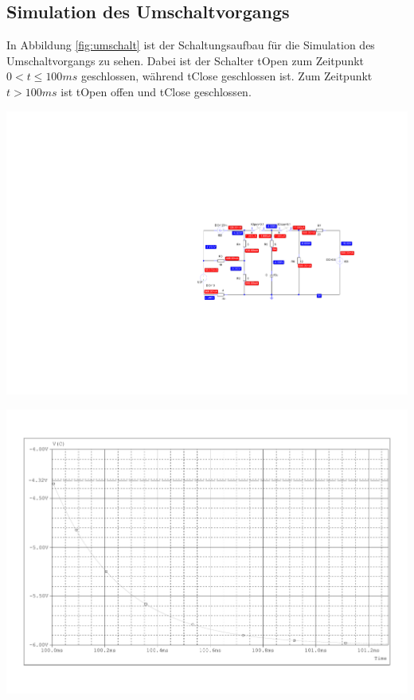 \documentclass[11pt]{scrartcl}
\begin{document}
\newpage
\subsection{Simulation des Umschaltvorgangs}
In Abbildung \ref{fig:umschalt} ist der Schaltungsaufbau für die Simulation des Umschaltvorgangs zu sehen.
Dabei ist der Schalter tOpen zum Zeitpunkt $0 < t \leq 100 \unit{ms}$ geschlossen, während tClose geschlossen ist.
Zum Zeitpunkt $t > 100 \unit{ms}$ ist tOpen offen und tClose geschlossen.

\begin{center}
  \includegraphics[scale=1.3]{./Assets/gesamter Schaltvorgang.pdf}
  \label{fig:umschalt}
\end{center}

\begin{center}
  \includegraphics[width=0.8\linewidth]{./Assets/PS_SV.pdf}
  \label{fig:umschalt_1}
\end{center}
\end{document}
